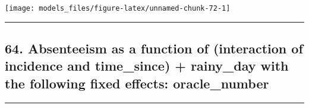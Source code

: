 \documentclass[]{article}
\begin{document}
\begin{center}\texttt{[image: models\_files/figure-latex/unnamed-chunk-72-1]} \end{center}

\newpage

\begin{center}\rule{0.5\linewidth}{\linethickness}\end{center}

\subsection{64. Absenteeism as a function of (interaction of incidence
and time\_since) + rainy\_day with the following fixed effects:
oracle\_number}\label{absenteeism-as-a-function-of-interaction-of-incidence-and-time_since-rainy_day-with-the-following-fixed-effects-oracle_number-1}

\begin{center}\rule{0.5\linewidth}{\linethickness}\end{center}
\end{document}
